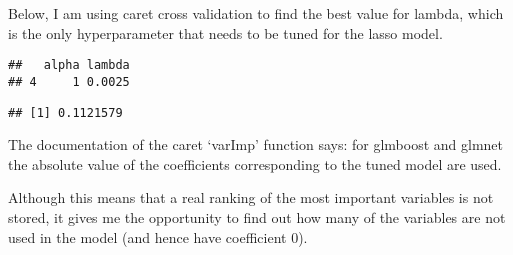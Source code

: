 \documentclass[]{article}
\newenvironment{Shaded}{\begin{snugshade}}{\end{snugshade}}
\newcommand{\DataTypeTok}[1]{\textcolor[rgb]{0.13,0.29,0.53}{#1}}
\newcommand{\DecValTok}[1]{\textcolor[rgb]{0.00,0.00,0.81}{#1}}
\newcommand{\FloatTok}[1]{\textcolor[rgb]{0.00,0.00,0.81}{#1}}
\newcommand{\KeywordTok}[1]{\textcolor[rgb]{0.13,0.29,0.53}{\textbf{#1}}}
\newcommand{\NormalTok}[1]{#1}
\newcommand{\OperatorTok}[1]{\textcolor[rgb]{0.81,0.36,0.00}{\textbf{#1}}}
\newcommand{\StringTok}[1]{\textcolor[rgb]{0.31,0.60,0.02}{#1}}
\begin{document}
Below, I am using caret cross validation to find the best value for
lambda, which is the only hyperparameter that needs to be tuned for the
lasso model.

\begin{Shaded}
\end{Shaded}

\begin{verbatim}
##   alpha lambda
## 4     1 0.0025
\end{verbatim}

\begin{Shaded}
\end{Shaded}

\begin{verbatim}
## [1] 0.1121579
\end{verbatim}

The documentation of the caret `varImp' function says: for glmboost and
glmnet the absolute value of the coefficients corresponding to the tuned
model are used.

Although this means that a real ranking of the most important variables
is not stored, it gives me the opportunity to find out how many of the
variables are not used in the model (and hence have coefficient 0).
\end{document}
